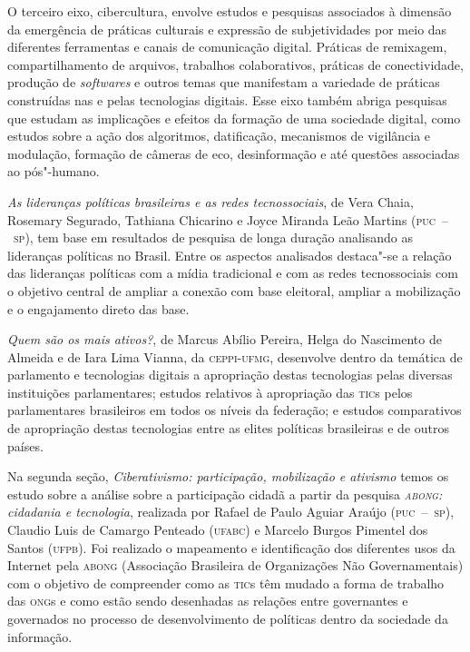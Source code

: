 O terceiro eixo, cibercultura, envolve estudos e pesquisas associados à
dimensão da emergência de práticas culturais e expressão de
subjetividades por meio das diferentes ferramentas e canais de
comunicação digital. Práticas de remixagem, compartilhamento de
arquivos, trabalhos colaborativos, práticas de conectividade, produção
de \textit{softwares} e outros temas que manifestam a variedade de práticas
construídas nas e pelas tecnologias digitais. Esse eixo também abriga
pesquisas que estudam as implicações e efeitos da formação de uma
sociedade digital, como estudos sobre a ação dos algoritmos,
datificação, mecanismos de vigilância e modulação, formação de câmeras
de eco, desinformação e até questões associadas ao pós"-humano.


\textit{As lideranças políticas brasileiras e as redes tecnossociais}, de Vera Chaia, Rosemary Segurado, Tathiana Chicarino e
Joyce Miranda Leão Martins (\textsc{puc~--~sp}), tem base em resultados de
pesquisa de longa duração analisando as lideranças políticas no Brasil.
Entre os aspectos analisados destaca"-se a relação das lideranças
políticas com a mídia tradicional e com as redes tecnossociais com o
objetivo central de ampliar a conexão com base eleitoral, ampliar a
mobilização e o engajamento direto das base.

\textit{Quem são os mais ativos?}, de
Marcus Abílio Pereira, Helga do Nascimento de Almeida e de Iara Lima
Vianna, da \textsc{ceppi}-\textsc{ufmg}, desenvolve dentro da temática de parlamento e
tecnologias digitais a apropriação destas tecnologias pelas diversas
instituições parlamentares; estudos relativos à apropriação das \textsc{tic}s
pelos parlamentares brasileiros em todos os níveis da federação; e
estudos comparativos de apropriação destas tecnologias entre as elites
políticas brasileiras e de outros países.

Na segunda seção, \textit{Ciberativismo: participação, mobilização e
ativismo} temos os estudo sobre a análise sobre a participação
cidadã a partir da pesquisa \textit{\textsc{abong}: cidadania e tecnologia}, realizada por
Rafael de Paulo Aguiar Araújo (\textsc{puc~--~sp}), Claudio Luis de Camargo Penteado
(\textsc{ufabc}) e Marcelo Burgos Pimentel dos Santos (\textsc{ufpb}). Foi realizado o
mapeamento e identificação dos diferentes usos da Internet pela
\textsc{abong} (Associação Brasileira de Organizações Não Governamentais) com o
objetivo de compreender como as \textsc{tic}s têm mudado a forma de trabalho das \textsc{ong}s
e como estão sendo desenhadas as relações entre governantes
e governados no processo de desenvolvimento de políticas dentro da
sociedade da informação.

